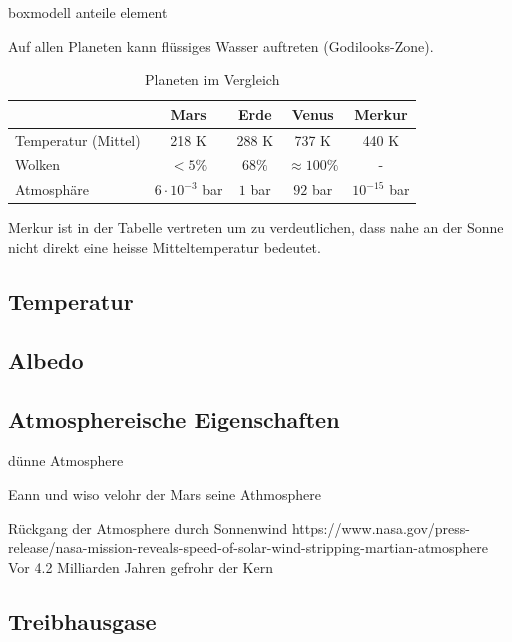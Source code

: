 \begin{refsection}
boxmodell anteile element



Auf allen Planeten kann flüssiges Wasser auftreten (Godilooks-Zone).

\begin{center}
\begin{table}
	\center
	\begin{tabular}{l|c c c c}
                      & Mars    & Erde   & Venus           & Merkur\\
  \hline
  Temperatur (Mittel) & 218 K   & 288 K  & 737 K           & 440 K\\
  Wolken              & $<5\%$ & $68\%$ & $\approx100\%$ & - \\
  Atmosphäre          & $6 \cdot 10^{-3}$ bar & $1$ bar & $92$ bar & $10^{-15}$ bar
	
\end{tabular}
\caption{Planeten im Vergleich}
\end{table}

\end{center}

Merkur ist in der Tabelle vertreten um zu verdeutlichen, dass nahe an der Sonne nicht direkt eine heisse Mitteltemperatur bedeutet.


\subsection{Temperatur}

\subsection{Albedo}

\subsection{Atmosphereische Eigenschaften}

dünne Atmosphere

Eann und wiso velohr der Mars seine Athmosphere


Rückgang der Atmosphere durch Sonnenwind
	https://www.nasa.gov/press-release/nasa-mission-reveals-speed-of-solar-wind-stripping-martian-atmosphere
	Vor 4.2 Milliarden Jahren gefrohr der Kern


\subsection{Treibhausgase}


\end{refsection}
